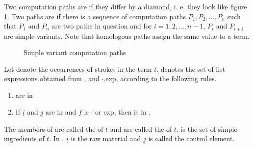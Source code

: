 \begin{defi}
Two computation paths are  if they differ by a diamond, i. e. they look like figure \ref{fig:simplevariantshomologous}. Two paths are  if there is a sequence of computation paths $P_1,P_2,\ldots,P_n$ such that $P_1$ and $P_n$ are two paths in question and for $i=1,2,\ldots,n-1$, $P_i$ and $P_{i+1}$ are simple variants. Note that homologous paths assign the same value to a term.
\cite{conf/ijcai/Geiser75}
\end{defi}

\begin{figure}[hbt!]
\centering
{}
\caption{Simple variant computation paths}
\label{fig:simplevariantshomologous}
\end{figure}

\begin{defi}
Let  denote the occurrences of strokes in the term $t$.  denotes the set of list expressions obtained from , and $\cdot$,$\mbox{exp}$, according to the following rules.
\begin{enumerate}
 \item {} are in 
 \item If $\underline{i}$ and $\underline{j}$ are in  and $f$ is $\cdot$ or $\mbox{exp}$, then  is in .
\end{enumerate}
The members of  are called the  of $t$ and are called the  of $t$.  is the set of simple ingredients of $t$. In , $\underline{i}$ is the raw material and $\underline{j}$ is called the control element.
\cite{conf/ijcai/Geiser75}
\end{defi}

